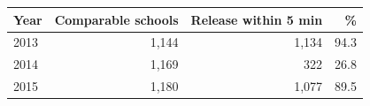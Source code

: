 
\begin{tabular}{lrrr}
\toprule
Year & Comparable schools & Release within 5 min & \%\\
\midrule
2013 & 1,144 & 1,134 & 94.3\\
2014 & 1,169 & 322 & 26.8\\
2015 & 1,180 & 1,077 & 89.5\\
\bottomrule
\end{tabular}
